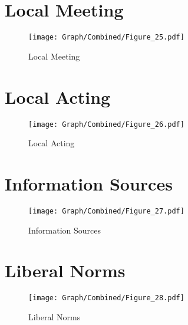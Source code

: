 \documentclass[10pt,a4paper]{article}
\begin{document}
\section{Local Meeting}
\begin{table}[H]\centering

\end{table}
\begin{figure}[H]\centering
\texttt{[image: Graph/Combined/Figure\_25.pdf]}
\caption{Local Meeting} \label{fig:Fig_25}
\end{figure}
\begin{table}[H]\centering

\end{table}
\section{Local Acting}
\begin{table}[H]\centering

\end{table}
\begin{figure}[H]\centering
\texttt{[image: Graph/Combined/Figure\_26.pdf]}
\caption{Local Acting} \label{fig:Fig_26}
\end{figure}
\begin{table}[H]\centering

\end{table}
\section{Information Sources}
\begin{table}[H]\centering

\end{table}
\begin{figure}[H]\centering
\texttt{[image: Graph/Combined/Figure\_27.pdf]}
\caption{Information Sources} \label{fig:Fig_27}
\end{figure}
\begin{table}[H]\centering

\end{table}
\section{Liberal Norms}
\begin{table}[H]\centering

\end{table}
\begin{figure}[H]\centering
\texttt{[image: Graph/Combined/Figure\_28.pdf]}
\caption{Liberal Norms} \label{fig:Fig_28}
\end{figure}
\begin{table}[H]\centering

\end{table}
\end{document}
